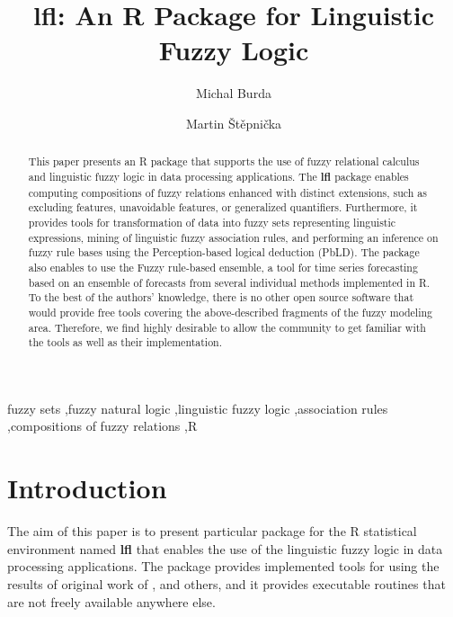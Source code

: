 \documentclass[review]{elsarticle}
\newcommand{\pkg}[1]{\textbf{#1}}
\newcommand{\proglang}[1]{#1}
\newcommand{\R}{\proglang{R}}
\begin{document}
\begin{frontmatter}

\title{lfl: An \R{} Package for Linguistic Fuzzy Logic}

\author{Michal Burda}
\author{Martin \v{S}t\v{e}pni\v{c}ka}
\address{Institute for Research and Applications of Fuzzy Modeling, University of Ostrava, CE~IT4Innovations, 30.~dubna 22, 701 03 Ostrava, Czech Republic}


\begin{abstract}
This paper presents an \R{} package that supports the use of fuzzy relational calculus and linguistic fuzzy logic in data processing applications. The \pkg{lfl} package enables computing compositions of fuzzy relations enhanced with distinct extensions, such as excluding features, unavoidable features, or generalized quantifiers. Furthermore, it provides tools for transformation of data into fuzzy sets representing linguistic expressions, mining of linguistic fuzzy association rules, and performing an inference on fuzzy rule bases using the Perception-based logical deduction (PbLD). The package also enables to use the Fuzzy rule-based ensemble, a tool for time series forecasting based on an ensemble of forecasts from several individual methods implemented in \R{}. To the best of the authors' knowledge, there is no other open source software that would provide free tools covering the above-described fragments of the fuzzy modeling area. Therefore, we find highly desirable to allow the community to get familiar with the tools as well as their implementation.
\end{abstract}

\begin{keyword}
fuzzy sets \sep fuzzy natural logic \sep linguistic fuzzy logic \sep association rules \sep compositions of fuzzy relations \sep\R{}
\end{keyword}

\end{frontmatter}

\linenumbers


\section{Introduction} \label{sec:intro}


The aim of this paper is to present particular package for the \R{} statistical environment \citep{R2020, Rintro} named {\bf lfl} that enables the use of the linguistic fuzzy logic in data processing applications. The package provides implemented tools for using the results of original work of \cite{Novak08, Novak:PbLD, DvoStep:PbLD2015, StepBurda:FRBE_FSS}, and others, and it provides executable routines that are not freely available anywhere else.
\end{document}
